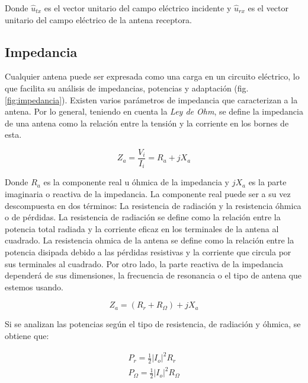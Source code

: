 \par Donde $\hat{u}_{tx}$ es el vector unitario del campo eléctrico incidente y $\hat{u}_{rx}$ es el vector unitario del campo eléctrico de la antena receptora. 

\subsection{Impedancia}

\par Cualquier antena puede ser expresada como una carga en un circuito eléctrico, lo que facilita su análisis de impedancias, potencias y adaptación (fig. \ref{fig:impedancia}). Existen varios parámetros de impedancia que caracterizan a la antena. Por lo general, teniendo en cuenta la \textit{Ley de Ohm}, se define la impedancia de una antena como la relación entre la tensión y la corriente en los bornes de esta. 

\begin{equation}
	Z_{a}=\frac{V_{i}}{I_{i}}=R_{a}+jX_{a}
	\label{eq:impendaciaantena}
\end{equation}

\par Donde $R_{a}$ es la componente real u óhmica de la impedancia y $jX_{a}$ es la parte imaginaria o reactiva de la impedancia. La componente real puede ser a su vez descompuesta en dos términos: La resistencia de radiación y la resistencia óhmica o de pérdidas. La resistencia de radiación se define como la relación entre la potencia total radiada y la corriente eficaz en los terminales de la antena al cuadrado. La resistencia ohmica de la antena se define como la relación entre la potencia disipada debido a las pérdidas resistivas y la corriente que circula por sus terminales al cuadrado. Por otro lado, la parte reactiva de la impedancia dependerá de sus dimensiones, la frecuencia de resonancia o el tipo de antena que estemos usando.

\begin{equation}
	Z_{a}=(R_{r}+R_{\Omega})+jX_{a}
	\label{eq:impendaciaantenatotal}
\end{equation}

\par Si se analizan las potencias según el tipo de resistencia, de radiación y óhmica, se obtiene que:

\begin{subequations}
	\begin{eqnarray}
		P_{r}=\frac{1}{2}\left | I_{o}  \right |^{2}R_{r} \label{ecu:potenciarad} \\ %
		P_{\Omega}=\frac{1}{2}\left | I_{o}  \right |^{2}R_{\Omega} \label{ecu:potenciaohm} 
	\end{eqnarray}
\end{subequations}

